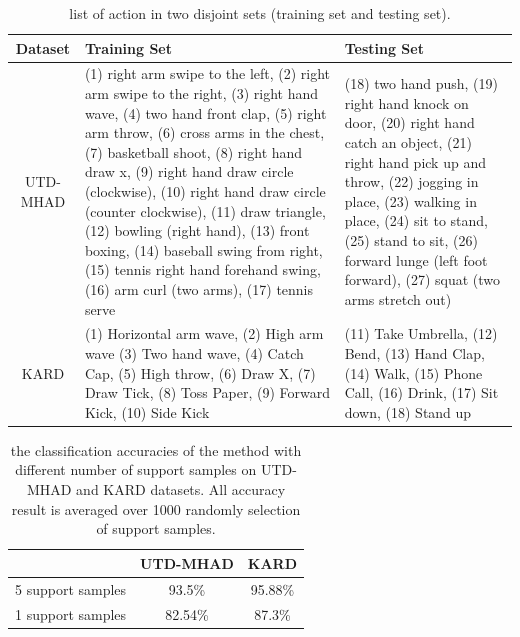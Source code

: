\documentclass{bmvc2k}
\begin{document}
\begin{table}[htb]
	\begin{center}
		\begin{tabular}{|c|p{4.8cm}|p{4cm}|}
			
			\hline
			Dataset & Training Set  & Testing Set \\
			\hline\hline
			UTD-MHAD & (1) right arm swipe to the left, (2) right arm swipe to the right, (3) right hand wave, (4) two hand front clap, (5) right arm throw, (6) cross arms in the chest, (7) basketball shoot, (8) right hand draw x, (9) right hand draw circle (clockwise), (10) right hand draw circle (counter clockwise), (11) draw triangle, (12) bowling (right hand), (13) front boxing, (14) baseball swing from right, (15) tennis right hand forehand swing, (16) arm curl (two arms), (17) tennis serve & (18) two hand push, (19) right hand knock on door, (20) right hand catch an object, (21) right hand pick up and throw, (22) jogging in place, (23) walking in place, (24) sit to stand, (25) stand to sit, (26) forward lunge (left foot forward), (27) squat (two arms stretch out)\\
			\hline
			KARD & (1) Horizontal arm wave, (2) High arm wave
			(3) Two hand wave, (4) Catch Cap, (5) High throw, (6) Draw X, (7) Draw Tick, (8) Toss Paper, (9) Forward Kick, (10) Side Kick
			& (11) Take Umbrella, (12) Bend, (13) Hand Clap, (14) Walk, (15) Phone Call, (16) Drink, (17) Sit down, (18) Stand up \\
			\hline
		\end{tabular}	
	\end{center}
	\caption{ list of action in two disjoint sets (training set and testing set). }	
	\label{tab:3}
\end{table}
\begin{table}[htbp]
	\begin{center}	
		\begin{tabular}{|c|c|c|}
			\hline
			& UTD-MHAD & KARD\\
			\hline\hline
			5 support samples & 93.5\% & 95.88\% \\
			1 support samples & 82.54\%
			& 87.3\%\\
			\hline
		\end{tabular}	
	\end{center}
	\caption{ the classification accuracies of the method with different number of support samples on UTD-MHAD and KARD datasets. All accuracy result is averaged over 1000 randomly selection of support samples. }	
	\label{tab:4}
\end{table}
\end{document}
